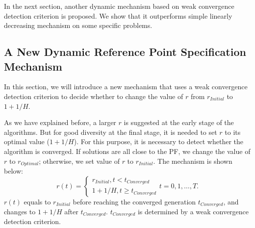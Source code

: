 \documentclass[conference]{IEEEtran}
\begin{document}
In the next section, another dynamic mechanism based on weak convergence detection criterion is proposed. 
We show that it outperforms simple linearly decreasing mechanism on some specific problems. 


% 
\subsection{A New Dynamic Reference Point Specification Mechanism}
In this section,
we will introduce a new mechanism that uses a weak convergence detection criterion to 
decide whether to change the value of $r$ from $r_{Initial}$ to $1+1/H$. 

As we have explained before, 
a larger $r$ is suggested at the early stage of the algorithms. 
But for good diversity at the final stage,
it is needed to set $r$ to its optimal value ($1+1/H$). 
For this purpose, it is necessary to detect whether the algorithm is converged. 
If solutions are all close to the PF, 
we change the value of $r$ to $r_{Optimal}$; otherwise, we set value of $r$ to 
$r_{Initial}$. The mechanism is shown below:
\begin{equation}\label{endm1}
  r(t)=
  \begin{cases}
    r_{Initial}, t<t_{Converged}\\
    1+1/H, t \ge t_{Converged} 
  \end{cases}
  t=0,1,\dots,T.
\end{equation}
$r(t)$ equals to $r_{Initial}$ before reaching the converged generation $t_{Converged}$, 
and changes to $1+1/H$ after $t_{Converged}$. 
$t_{Converged}$ is determined by a weak convergence detection criterion. 
\end{document}
